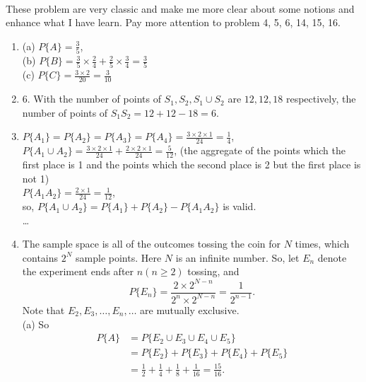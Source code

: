 \documentclass{article}
\numberwithin{equation}{subsection}
\begin{document}
			\paragraph{} These problem are very classic and make me more clear about some notions and enhance what I have learn. Pay more attention to problem 4, 5, 6, 14, 15, 16.
			\begin{enumerate}
			\item (a) $P\{A\} = \frac{3}{5}$, \\ (b) $P\{B\} = \frac{3}{5}\times\frac{2}{4} + \frac{2}{5}\times\frac{3}{4} = \frac{3}{5}$ \\ (c) $P\{C\}=\frac{3\times2}{20} = \frac{3}{10}$  
			\item 6. With the number of points of $S_1, S_2, S_1\cup S_2$ are $12, 12, 18$ respectively, the number of points of $S_1S_2 = 12 + 12 - 18 = 6$. 
			\item $P\{A_1\} = P\{A_2\} = P\{A_3\} = P\{A_4\} = \frac{3\times2\times1}{24} = \frac{1}{4}$, \\ $P\{A_1\cup A_2\}=\frac{3\times2\times1}{24} + \frac{2\times2\times1}{24} = \frac{5}{12}$, (the aggregate of the points which the first place is 1 and the points which the second place is 2 but the first place is not 1) \\ $P\{A_1A_2\} = \frac{2\times1}{24} = \frac{1}{12}$, \\
			so, $P\{A_1\cup A_2\} = P\{A_1\} + P\{A_2\} - P\{A_1A_2\}$ is valid. \\ \dots 
			\item The sample space is all of the outcomes tossing the coin for $N$ times, which contains $2^N$ sample points. Here $N$ is an infinite number. So, let $E_n$ denote the experiment ends after $n (n\geq2)$ tossing, and 
			\begin{equation}
				P\{E_n\} = \frac{2 \times 2^{N-n}}{2^n \times 2^{N-n}} = \frac{1}{2^{n-1}}.
			\end{equation}
			Note that $E_2, E_3,\dots,E_n,\dots$ are mutually exclusive. \\(a) So 
			\begin{equation}
				\begin{aligned}
					P\{A\} &= P\{E_2 \cup E_3 \cup E_4 \cup E_5\} \\
					 &= P\{E_2\} + P\{E_3\} + P\{E_4\} + P\{E_5\} \\ 
					 &= \frac{1}{2} + \frac{1}{4} + \frac{1}{8} + \frac{1}{16} = \frac{15}{16}.
				\end{aligned}
			\end{equation}

\end{enumerate}
\end{document}
